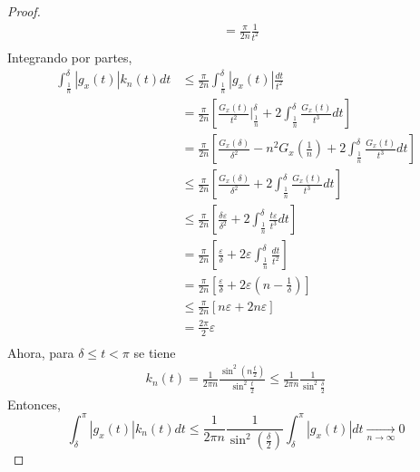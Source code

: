 \documentclass[12pt]{report}
\theoremstyle{largebreak}
\renewcommand{\leq}{\ensuremath{\leqslant}}
\newcommand\abs[1]{\ensuremath{\left|#1\right|}}
\begin{document}
\begin{proof}
\begin{equation*}
\begin{split}
                &=\frac{\pi}{2n}\frac{1}{t^2}\\
            \end{split}
        \end{equation*}
        Integrando por partes,
        \begin{equation*}
            \begin{split}
                \int_{\frac{1}{n}}^\delta\abs{g_x(t)}k_n(t)dt&\leq\frac{\pi}{2n}\int_{\frac{1}{n}}^\delta\abs{g_x(t)}\frac{dt}{t^2}\\
                &=\frac{\pi}{2n}\left[\frac{G_x(t)}{t^2}\Big|_{\frac{1}{n}}^{\delta}+2\int_{\frac{1}{n}}^\delta \frac{G_x(t)}{t^3}dt\right]\\
                &=\frac{\pi}{2n}\left[\frac{G_x(\delta)}{\delta^2}-n^2G_x\left(\frac{1}{n}\right)+2\int_{\frac{1}{n}}^\delta \frac{G_x(t)}{t^3}dt\right]\\
                &\leq\frac{\pi}{2n}\left[\frac{G_x(\delta)}{\delta^2}+2\int_{\frac{1}{n}}^\delta \frac{G_x(t)}{t^3}dt\right]\\
                &\leq\frac{\pi}{2n}\left[\frac{\delta\varepsilon}{\delta^2}+2\int_{\frac{1}{n}}^\delta \frac{t\varepsilon}{t^3}dt\right]\\
                &=\frac{\pi}{2n}\left[\frac{\varepsilon}{\delta}+2\varepsilon\int_{\frac{1}{n}}^\delta \frac{dt}{t^2}\right]\\
                &=\frac{\pi}{2n}\left[\frac{\varepsilon}{\delta}+2\varepsilon\left(n-\frac{1}{\delta} \right) \right]\\
                &\leq\frac{\pi}{2n}\left[n\varepsilon+2n\varepsilon\right]\\
                &=\frac{2\pi}{2}\varepsilon\\
            \end{split}
        \end{equation*}
        Ahora, para $\delta\leq t<\pi$ se tiene
        \begin{equation*}
            \begin{split}
                k_n(t)=\frac{1}{2\pi n}\frac{\sin^2\left(n\frac{t}{2} \right)}{\sin^2\frac{t}{2}}\leq\frac{1}{2\pi n}\frac{1}{\sin^2\frac{\delta}{2}}
            \end{split}
        \end{equation*}
        Entonces,
        \begin{equation*}
            \int_\delta^{\pi}\abs{g_x(t)}k_n(t)dt\leq\frac{1}{2\pi n}\frac{1}{\sin^2\left(\frac{\delta}{2} \right)}\int_\delta^{\pi}\abs{g_x(t)}dt\underset{ n\rightarrow\infty}{\rightarrow}0

\end{equation*}
\end{proof}
\end{document}
